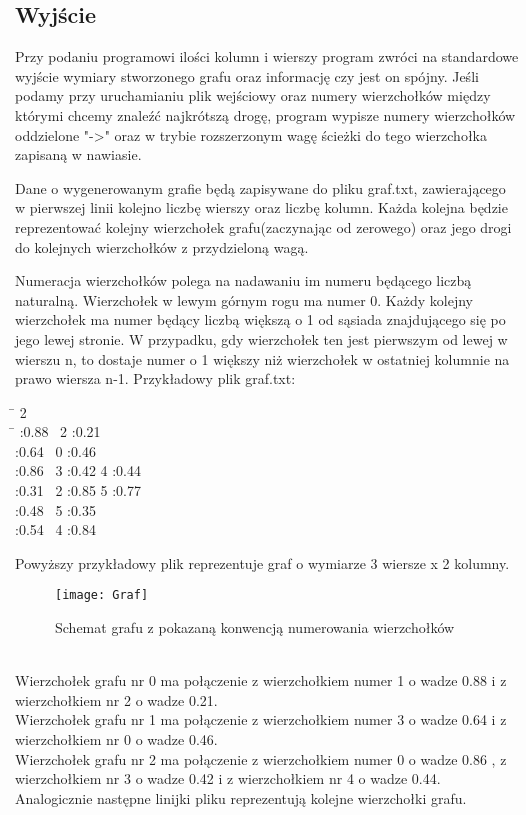 \documentclass{article}
\begin{document}
\subsection{Wyjście}
\label{sec:Wyjscie}
Przy podaniu programowi ilości kolumn i wierszy program zwróci na standardowe wyjście wymiary stworzonego grafu oraz informację czy jest on spójny.
Jeśli podamy przy uruchamianiu plik wejściowy oraz numery wierzchołków między którymi chcemy znaleźć najkrótszą drogę, program wypisze numery wierzchołków oddzielone "->" oraz w trybie rozszerzonym wagę ścieżki do tego wierzchołka zapisaną w nawiasie. 

Dane o wygenerowanym grafie będą zapisywane do pliku graf.txt, zawierającego w pierwszej linii kolejno liczbę wierszy oraz liczbę kolumn. Każda kolejna będzie reprezentować kolejny wierzchołek grafu(zaczynając od zerowego) oraz jego drogi do kolejnych wierzchołków z przydzieloną wagą. 

Numeracja wierzchołków polega na nadawaniu im numeru będącego liczbą naturalną. Wierzchołek w lewym górnym rogu ma numer 0. Każdy kolejny wierzchołek ma numer będący liczbą większą o 1 od sąsiada znajdującego się po jego lewej stronie. W przypadku, gdy wierzchołek ten jest pierwszym od lewej w wierszu n, to dostaje numer o 1 większy niż wierzchołek w ostatniej kolumnie na prawo wiersza n-1. 
\newpage
Przykładowy plik graf.txt: 
\begin{tabbing}
\hspace{0em} \= \kill
     2\\
    \hspace{2em} \= \kill
	  :0.88 \ 2 :0.21 \\
	  :0.64 \ 0 :0.46  \\
	  :0.86 \ 3 :0.42 4 :0.44\\
	  :0.31 \ 2 :0.85 5 :0.77\\
	  :0.48 \ 5 :0.35 \\
	  :0.54 \ 4 :0.84 \\
\end{tabbing}
Powyższy przykładowy plik reprezentuje graf o wymiarze 3 wiersze x 2 kolumny.
\begin{figure}[h]
    \centering
    \caption{Schemat grafu z pokazaną konwencją numerowania wierzchołków}
    \texttt{[image: Graf]}
    \label{fig:schemat}
\end{figure}
\\Wierzchołek grafu nr 0 ma połączenie z wierzchołkiem numer 1 o wadze 0.88 i z wierzchołkiem nr 2 o wadze 0.21.\\
Wierzchołek grafu nr 1 ma połączenie z wierzchołkiem numer 3 o wadze 0.64 i z wierzchołkiem nr 0 o wadze 0.46.\\
Wierzchołek grafu nr 2 ma połączenie z wierzchołkiem numer 0 o wadze 0.86 , z wierzchołkiem nr 3 o wadze 0.42 i z wierzchołkiem nr 4 o wadze 0.44.\\
Analogicznie następne linijki pliku reprezentują kolejne wierzchołki grafu.
\end{document}
